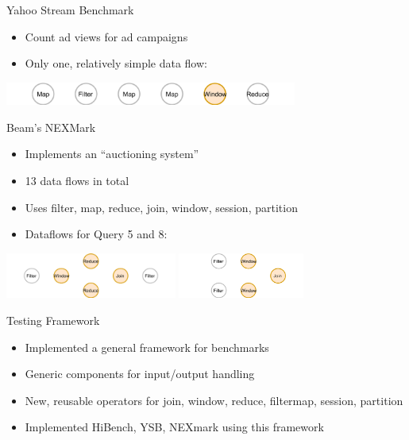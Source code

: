 \documentclass[14pt,t]{beamer}
\renewcommand{\title}[1]{
  {\huge #1} \vskip 0.4cm
}
\begin{document}
\begin{frame}
  \title{Yahoo Stream Benchmark\footnotemark}
  \begin{itemize}
  \item Count ad views for ad campaigns
  \item Only one, relatively simple data flow:
  \end{itemize}
  \includegraphics[height=0.75cm]{ysb.png}
\end{frame}

\begin{frame}
  \title{Beam's NEXMark\footnotemark}
  \begin{itemize}
  \item Implements an ``auctioning system''
  \item 13 data flows in total
  \item Uses filter, map, reduce, join, window, session, partition
  \item Dataflows for Query 5 and 8:
  \end{itemize}
  \includegraphics[height=1.5cm]{nex-5.png}
  \hfill
  \includegraphics[height=1.5cm]{nex-8.png}
\end{frame}

\begin{frame}
  \title{Testing Framework}
  \begin{itemize}
  \item Implemented a general framework for benchmarks
  \item Generic components for input/output handling
  \item New, reusable operators for join, window, reduce, filtermap, session, partition
  \item Implemented HiBench, YSB, NEXmark using this framework
  \end{itemize}
\end{frame}
\end{document}
